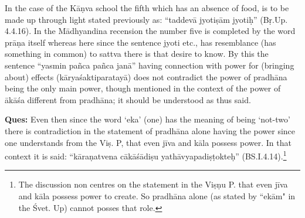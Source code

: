 \textbf{}

\vskip -2pt


\vskip -2pt


\vskip -2pt

In the case of the Kāṇva school the fifth which has an absence of food, is to be made up through light stated previously as: “taddevā jyotiṣām jyotiḥ” (Bṛ.Up. 4.4.16). In the Mādhyandina recension the number five is completed by the word prāṇa itself whereas here since the sentence jyoti etc., has resemblance (has something in common) to sattva there is that desire to know. By this the sentence “yasmin pañca pañca janā” having connection with power for (bringing about) effects (kāryaśaktiparatayā) does not contradict the power of pradhāna being the only main power, though mentioned in the context of the power of ākāśa different from pradhāna; it should be understood as thus said.

\textbf{Ques:} Even then since the word ‘eka’ (one) has the meaning of being ‘not-two’ there is contradiction in the statement of pradhāna alone having the power since one understands from the Viṣ. P, that even jīva and kāla possess power. In that context it is said: “kāraṇatvena cākāśādiṣu yathāvyapadiṣṭokteḥ” (BS.I.4.14).\footnote{The discussion non centres on the statement in the Viṣṇu P. that even jīva and kāla possess power to create. So pradhāna alone (as stated by ``ekām" in the Śvet. Up) cannot posses that role.}

\textbf{}


